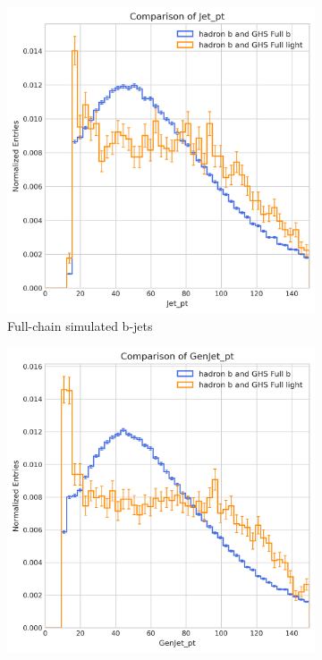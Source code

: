 \documentclass[10pt,twocolumn]{article}
\begin{document}
\begin{figure}[!htbp]
    \centering
    \begin{subfigure}[t]{0.48\textwidth}
        \centering
        \includegraphics[width=\textwidth]{images/compare_pt_GHSFull_light_vs_b_filter_hadronFlavour_5.png}
        \caption{Full-chain simulated b-jets}
        \label{fig:pt_b_hadron_full}
    \end{subfigure}
    \hfill
    \begin{subfigure}[t]{0.48\textwidth}
        \centering
        \includegraphics[width=\textwidth]{images/compare_GenJet_pt_GHSFull_light_vs_b_filter_hadronFlavour_5.png}

\end{subfigure}
\end{figure}
\end{document}
